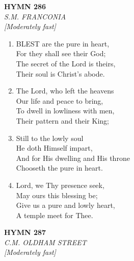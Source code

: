 \documentclass[11pt,a4paper]{article}
\begin{document}
\newpage
\begin{center}
    {\Large \textbf{HYMN 286}}
    \\
    \textit{S.M. FRANCONIA}
    \\
    \textit{\small [Moderately fast]}
\end{center}
\vspace{1em}

\begin{enumerate}
    \item BLEST are the pure in heart, \\
        For they shall see their God; \\
        The secret of the Lord is theirs, \\
        Their soul is Christ's abode.

    \item The Lord, who left the heavens \\
        Our life and peace to bring, \\
        To dwell in lowliness with men, \\
        Their pattern and their King;

    \item Still to the lowly soul \\
        He doth Himself impart, \\
        And for His dwelling and His throne \\
        Chooseth the pure in heart.

    \item Lord, we Thy presence seek, \\
        May ours this blessing be; \\
        Give us a pure and lowly heart, \\
        A temple meet for Thee.

\end{enumerate}

\newpage
\begin{center}
    {\Large \textbf{HYMN 287}}
    \\
    \textit{C.M. OLDHAM STREET}
    \\
    \textit{\small [Moderately fast]}
\end{center}
\vspace{1em}
\end{document}
